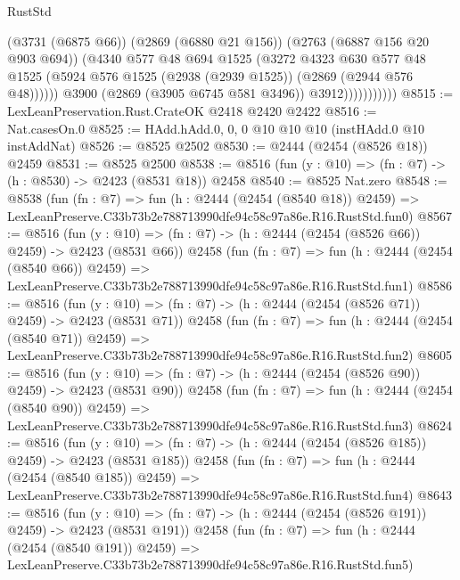 \begin{lexlean}{RustStd}
\begin{coremodule}
                            (@3731 (@6875 @66))
                            (@2869 (@6880 @21 @156))
                            (@2763 (@6887 @156 @20 @903 @694))
                            (@4340
                              @577
                              @48
                              @694
                              @1525
                              (@3272
                                @4323
                                @630
                                @577
                                @48
                                @1525
                                (@5924 @576 @1525 (@2938 (@2939 @1525)) (@2869 (@2944 @576 @48))))))
                          @3900
                          (@2869 (@3905 @6745 @581 @3496))
                          @3912)))))))))))
@8515 := LexLeanPreservation.Rust.CrateOK @2418 @2420 @2422
@8516 := Nat.casesOn.{0}
@8525 := HAdd.hAdd.{0, 0, 0} @10 @10 @10 (instHAdd.{0} @10 instAddNat)
@8526 := @8525 @2502
@8530 := @2444 (@2454 (@8526 @18)) @2459
@8531 := @8525 @2500
@8538 := @8516 (fun (y : @10) => (fn : @7) -> (h : @8530) -> @2423 (@8531 @18)) @2458
@8540 := @8525 Nat.zero
@8548 := @8538
    (fun (fn : @7) =>
    fun (h : @2444 (@2454 (@8540 @18)) @2459) =>
    LexLeanPreserve.C33b73b2e788713990dfe94c58c97a86e.R16.RustStd.fun0)
@8567 := @8516
    (fun (y : @10) => (fn : @7) -> (h : @2444 (@2454 (@8526 @66)) @2459) -> @2423 (@8531 @66))
    @2458
    (fun (fn : @7) =>
    fun (h : @2444 (@2454 (@8540 @66)) @2459) =>
    LexLeanPreserve.C33b73b2e788713990dfe94c58c97a86e.R16.RustStd.fun1)
@8586 := @8516
    (fun (y : @10) => (fn : @7) -> (h : @2444 (@2454 (@8526 @71)) @2459) -> @2423 (@8531 @71))
    @2458
    (fun (fn : @7) =>
    fun (h : @2444 (@2454 (@8540 @71)) @2459) =>
    LexLeanPreserve.C33b73b2e788713990dfe94c58c97a86e.R16.RustStd.fun2)
@8605 := @8516
    (fun (y : @10) => (fn : @7) -> (h : @2444 (@2454 (@8526 @90)) @2459) -> @2423 (@8531 @90))
    @2458
    (fun (fn : @7) =>
    fun (h : @2444 (@2454 (@8540 @90)) @2459) =>
    LexLeanPreserve.C33b73b2e788713990dfe94c58c97a86e.R16.RustStd.fun3)
@8624 := @8516
    (fun (y : @10) => (fn : @7) -> (h : @2444 (@2454 (@8526 @185)) @2459) -> @2423 (@8531 @185))
    @2458
    (fun (fn : @7) =>
    fun (h : @2444 (@2454 (@8540 @185)) @2459) =>
    LexLeanPreserve.C33b73b2e788713990dfe94c58c97a86e.R16.RustStd.fun4)
@8643 := @8516
    (fun (y : @10) => (fn : @7) -> (h : @2444 (@2454 (@8526 @191)) @2459) -> @2423 (@8531 @191))
    @2458
    (fun (fn : @7) =>
    fun (h : @2444 (@2454 (@8540 @191)) @2459) =>
    LexLeanPreserve.C33b73b2e788713990dfe94c58c97a86e.R16.RustStd.fun5)

\end{coremodule}
\end{lexlean}
